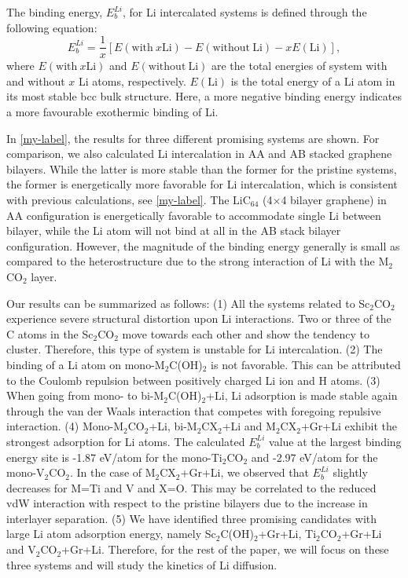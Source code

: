 The binding energy, $E_{b}^{Li}$, for Li intercalated systems is defined through the following equation:
\begin{equation}
E_{b}^{Li}=\frac{1}{x}[E(\mathrm{with~}x\mathrm{Li})-E(\mathrm{without~Li})-xE(\mathrm{Li})],
\end{equation}
	where $E(\mathrm{with~}x\mathrm{Li})$ and $E(\mathrm{without~Li})$ are the total energies of system with and without $x$ Li atoms, respectively. $E(\mathrm{Li})$ is the total energy of a Li atom in its most stable bcc bulk structure. Here, a more negative binding energy indicates a more favourable exothermic binding of Li.

In \autoref{my-label}, the results for three different promising systems are shown. For comparison, we also calculated Li intercalation in AA and AB stacked graphene bilayers. While the latter is more stable than the former for the pristine systems, the former is energetically more favorable for Li intercalation, which is consistent with previous calculations\cite{PhysRevB.93.245438}, see \autoref{my-label}.  The LiC$_{64}$ (4$\times$4 bilayer graphene) in AA configuration is energetically favorable to accommodate single Li between bilayer, while the Li atom will not bind at all in the AB stack bilayer configuration. However, the magnitude of the binding energy generally is small as compared to the heterostructure due to the strong interaction of Li with the M$_2$CO$_2$ layer.


Our results can be summarized as follows: 		
(1) All the systems related to Sc$_2$CO$_2$ experience severe structural distortion upon Li interactions. Two or three of the C atoms in the Sc$_2$CO$_2$ move towards each other and show the tendency to cluster. Therefore, this type of system is unstable for Li intercalation.  
(2) The binding of a Li atom on mono-M$_2$C(OH)$_2$ is not favorable. This can be attributed to the Coulomb repulsion between positively charged Li ion and H atoms. 
(3) When going from mono- to bi-M$_2$C(OH)$_2$+Li, Li adsorption is made stable again through the van der Waals interaction that competes with foregoing repulsive interaction. 
(4) Mono-M$_2$CO$_2$+Li,  bi-M$_2$CX$_2$+Li and M$_2$CX$_2$+Gr+Li exhibit the strongest adsorption for Li atoms. The calculated $E_{b}^{Li}$ value at the largest binding energy site is -1.87 eV/atom for the mono-Ti$_2$CO$_2$ and -2.97 eV/atom for the mono-V$_2$CO$_2$. In the case of M$_2$CX$_2$+Gr+Li, we observed that $E_{b}^{Li}$ slightly decreases for M=Ti and V and X=O.  This may be correlated to the reduced vdW interaction with respect to the pristine bilayers due to the increase in interlayer separation.   
(5) We have identified three promising candidates with large Li atom adsorption energy, namely Sc$_2$C(OH)$_2$+Gr+Li, Ti$_2$CO$_2$+Gr+Li and V$_2$CO$_2$+Gr+Li. Therefore, for the rest of the paper, we will focus on these three systems and will study the kinetics of Li diffusion. 

